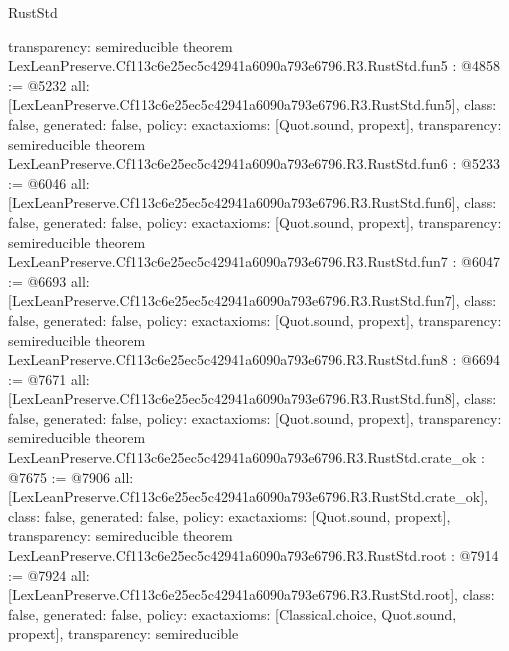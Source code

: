 \begin{lexlean}{RustStd}
\begin{coremodule}
{  transparency: semireducible
}
theorem LexLeanPreserve.Cf113c6e25ec5c42941a6090a793e6796.R3.RustStd.fun5 : @4858 := @5232 {
  all: [LexLeanPreserve.Cf113c6e25ec5c42941a6090a793e6796.R3.RustStd.fun5],
  class: false,
  generated: false,
  policy: exact{axioms: [Quot.sound, propext]},
  transparency: semireducible
}
theorem LexLeanPreserve.Cf113c6e25ec5c42941a6090a793e6796.R3.RustStd.fun6 : @5233 := @6046 {
  all: [LexLeanPreserve.Cf113c6e25ec5c42941a6090a793e6796.R3.RustStd.fun6],
  class: false,
  generated: false,
  policy: exact{axioms: [Quot.sound, propext]},
  transparency: semireducible
}
theorem LexLeanPreserve.Cf113c6e25ec5c42941a6090a793e6796.R3.RustStd.fun7 : @6047 := @6693 {
  all: [LexLeanPreserve.Cf113c6e25ec5c42941a6090a793e6796.R3.RustStd.fun7],
  class: false,
  generated: false,
  policy: exact{axioms: [Quot.sound, propext]},
  transparency: semireducible
}
theorem LexLeanPreserve.Cf113c6e25ec5c42941a6090a793e6796.R3.RustStd.fun8 : @6694 := @7671 {
  all: [LexLeanPreserve.Cf113c6e25ec5c42941a6090a793e6796.R3.RustStd.fun8],
  class: false,
  generated: false,
  policy: exact{axioms: [Quot.sound, propext]},
  transparency: semireducible
}
theorem LexLeanPreserve.Cf113c6e25ec5c42941a6090a793e6796.R3.RustStd.crate_ok : @7675 := @7906 {
  all: [LexLeanPreserve.Cf113c6e25ec5c42941a6090a793e6796.R3.RustStd.crate_ok],
  class: false,
  generated: false,
  policy: exact{axioms: [Quot.sound, propext]},
  transparency: semireducible
}
theorem LexLeanPreserve.Cf113c6e25ec5c42941a6090a793e6796.R3.RustStd.root : @7914 := @7924 {
  all: [LexLeanPreserve.Cf113c6e25ec5c42941a6090a793e6796.R3.RustStd.root],
  class: false,
  generated: false,
  policy: exact{axioms: [Classical.choice, Quot.sound, propext]},
  transparency: semireducible
}


\end{coremodule}
\end{lexlean}
